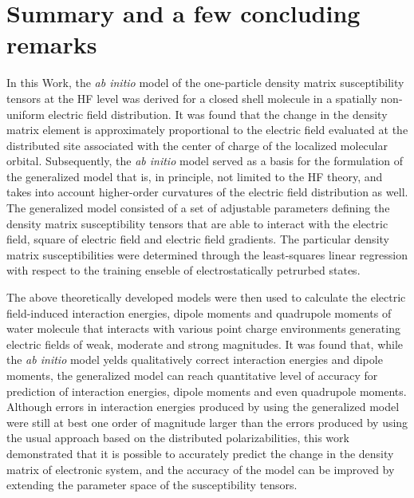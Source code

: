 \documentclass[aip,amsmath,amssymb,reprint]{revtex4-1}
\begin{document}



\section{\label{s:5}Summary and a few concluding remarks}

In this Work, the \emph{ab initio} model of the one\hyp{}particle density matrix susceptibility tensors
at the HF level was derived for a closed shell molecule in a spatially non\hyp{}uniform
electric field distribution. It was found that the change in the density matrix element
is approximately proportional to the electric field evaluated at the distributed site associated with the 
center of charge of the 
localized molecular orbital. Subsequently, the \emph{ab initio} model served as a basis
for the formulation of the generalized model that is, in principle, not limited to the HF theory,
and takes into account higher\hyp{}order curvatures of the electric field distribution as well.
The generalized model consisted of a set of adjustable parameters defining the density matrix susceptibility tensors
that are able to interact with the electric field, square of electric field and electric field gradients.
The particular density matrix susceptibilities were determined through the least\hyp{}squares 
linear regression with respect to the training enseble of electrostatically petrurbed states.

The above theoretically developed models were then used to calculate the electric field\hyp{}induced
interaction energies, dipole moments and quadrupole moments of water molecule that
interacts with various point charge environments generating electric fields of weak, moderate
and strong magnitudes. It was found that, while the \emph{ab initio} model yelds qualitatively correct
interaction energies and dipole moments, the generalized model can reach quantitative level of accuracy
for prediction of interaction energies, dipole moments and even quadrupole moments. Although 
errors in interaction energies produced by using the generalized model 
were still at best one order of magnitude larger than the errors produced by using the
usual approach based on the distributed polarizabilities, this work demonstrated that it is possible to
accurately predict the change in the density matrix of electronic system, and the accuracy of the model
can be improved by extending the parameter space of the susceptibility tensors. 
\end{document}
